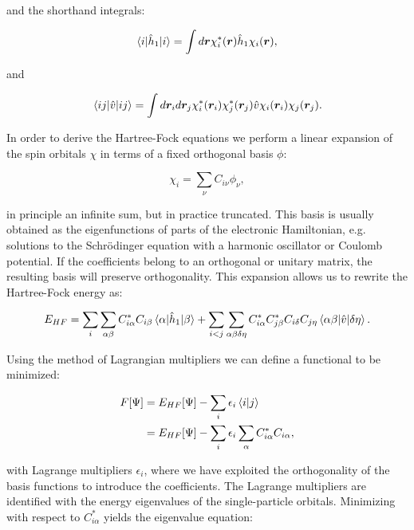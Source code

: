 and the shorthand integrals:

\begin{equation}
 \braket{i | \hat{h}_1 | i} =
    \int d\bm{r} \chi_i^*(\bm{r}) \hat{h}_1 \chi_i(\bm{r}) , 
\end{equation}

and

\begin{equation}
 \braket{ij | \hat{v} | ij} =
    \int d\bm{r}_i d\bm{r}_j \chi_i^*(\bm{r}_i) \chi_j^*(\bm{r}_j) 
    \hat{v} \chi_i(\bm{r}_i) \chi_j(\bm{r}_j) . 
\end{equation}

In order to derive the Hartree-Fock equations
we perform a linear expansion of the spin orbitals
$\chi$ in terms of a fixed orthogonal basis $\phi$:

\begin{equation}
 \chi_i = \sum_{\nu} C_{i\nu} \phi_{\nu} , 
\end{equation}

in principle an infinite sum, but in practice truncated.
This basis is usually obtained as the eigenfunctions of
parts of the electronic Hamiltonian, e.g. solutions
to the Schr\"{o}dinger equation with a harmonic oscillator
or Coulomb potential.
If the coefficients belong to an orthogonal or unitary matrix,
the resulting basis will preserve orthogonality.
This expansion allows us to rewrite the Hartree-Fock energy as:

\begin{equation}
 E_{HF} = \sum_i \sum_{\alpha \beta}
    C_{i \alpha}^* C_{i\beta} \braket{\alpha | \hat{h}_1 | \beta}
    + \sum_{i < j} \sum_{\alpha \beta \delta \eta}
    C_{i\alpha}^* C_{j\beta}^* C_{i\delta} C_{j\eta}
    \braket{\alpha \beta | \hat{v} | \delta \eta} .
\end{equation}

Using the method of Lagrangian multipliers
we can define a functional to be minimized:

\begin{equation}
\begin{split}
F[\Psi] &= E_{HF}[\Psi] - \sum_i \epsilon_i \braket{i | j} \\
        &= E_{HF}[\Psi] - \sum_i \epsilon_i \sum_{\alpha}
        C_{i\alpha}^* C_{i\alpha} ,
\end{split}
\end{equation}

with Lagrange multipliers $\epsilon_i$, where we have
exploited the orthogonality of the basis functions to
introduce the coefficients. The Lagrange multipliers
are identified with the energy eigenvalues
of the single-particle orbitals.
Minimizing with respect to $C_{i\alpha}^*$ yields
the eigenvalue equation:

